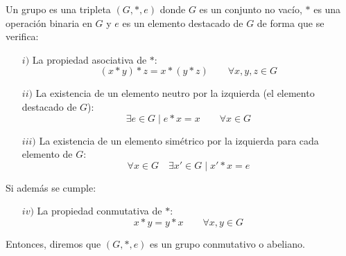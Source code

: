 \begin{definicion}[Grupo]
    Un grupo es una tripleta $(G,\ast,e)$ donde $G$ es un conjunto no vacío, $\ast$ es una operación binaria en $G$ y $e$ es un elemento destacado de $G$ de forma que se verifica:
    \begin{enumerate}
        \item[$i)$] La propiedad asociativa de $\ast$:
            \begin{equation*}
                (x\ast y) \ast z = x \ast (y\ast z) \qquad \forall x,y,z\in G
            \end{equation*}
        \item[$ii)$] La existencia de un elemento neutro por la izquierda (el elemento destacado de $G$):
            \begin{equation*}
                \exists e\in G \mid e\ast x = x \qquad \forall x\in G
            \end{equation*}
        \item[$iii)$] La existencia de un elemento simétrico por la izquierda para cada elemento de $G$:
            \begin{equation*}
                \forall x\in G \quad \exists x'\in G\mid x'\ast x = e
            \end{equation*}
    \end{enumerate}
    Si además se cumple:
    \begin{enumerate}
        \item[$iv)$] La propiedad conmutativa de $\ast$: 
            \begin{equation*}
                x\ast y = y \ast x \qquad \forall x,y\in G
            \end{equation*}
    \end{enumerate}
    Entonces, diremos que $(G,\ast,e)$ es un grupo conmutativo o abeliano.
\end{definicion}

